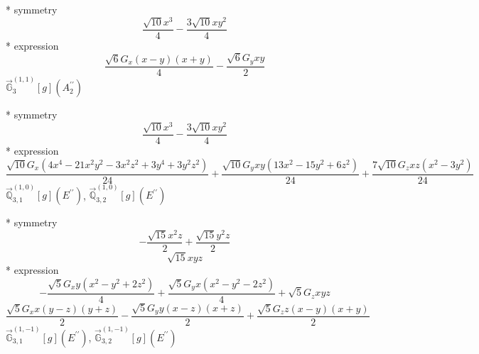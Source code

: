\documentclass[fleqn,8pt]{jsarticle}
\begin{document}
\noindent\quad ** symmetry
\begin{dmath*}
\frac{\sqrt{10} x^{3}}{4} - \frac{3 \sqrt{10} x y^{2}}{4}
\end{dmath*}
\noindent\quad ** expression
\begin{dmath*}
\frac{\sqrt{6} G_{x} \left(x - y\right) \left(x + y\right)}{4} - \frac{\sqrt{6} G_{y} x y}{2}
\end{dmath*}
\noindent\quad $\vec{\mathbb{G}}_{3}^{(1,1)}[g](A_{2}^{\prime\prime})$

\noindent\quad ** symmetry
\begin{dmath*}
\frac{\sqrt{10} x^{3}}{4} - \frac{3 \sqrt{10} x y^{2}}{4}
\end{dmath*}
\noindent\quad ** expression
\begin{dmath*}
\frac{\sqrt{10} G_{x} \left(4 x^{4} - 21 x^{2} y^{2} - 3 x^{2} z^{2} + 3 y^{4} + 3 y^{2} z^{2}\right)}{24} + \frac{\sqrt{10} G_{y} x y \left(13 x^{2} - 15 y^{2} + 6 z^{2}\right)}{24} + \frac{7 \sqrt{10} G_{z} x z \left(x^{2} - 3 y^{2}\right)}{24}
\end{dmath*}
\noindent\quad $\vec{\mathbb{Q}}_{3,1}^{(1,0)}[g](E^{\prime\prime})$, $\vec{\mathbb{Q}}_{3,2}^{(1,0)}[g](E^{\prime\prime})$

\noindent\quad ** symmetry
\begin{dmath*}
- \frac{\sqrt{15} x^{2} z}{2} + \frac{\sqrt{15} y^{2} z}{2}
\end{dmath*}
\begin{dmath*}
\sqrt{15} x y z
\end{dmath*}
\noindent\quad ** expression
\begin{dmath*}
- \frac{\sqrt{5} G_{x} y \left(x^{2} - y^{2} + 2 z^{2}\right)}{4} + \frac{\sqrt{5} G_{y} x \left(x^{2} - y^{2} - 2 z^{2}\right)}{4} + \sqrt{5} G_{z} x y z
\end{dmath*}
\begin{dmath*}
\frac{\sqrt{5} G_{x} x \left(y - z\right) \left(y + z\right)}{2} - \frac{\sqrt{5} G_{y} y \left(x - z\right) \left(x + z\right)}{2} + \frac{\sqrt{5} G_{z} z \left(x - y\right) \left(x + y\right)}{2}
\end{dmath*}
\noindent\quad $\vec{\mathbb{G}}_{3,1}^{(1,-1)}[g](E^{\prime\prime})$, $\vec{\mathbb{G}}_{3,2}^{(1,-1)}[g](E^{\prime\prime})$
\end{document}

